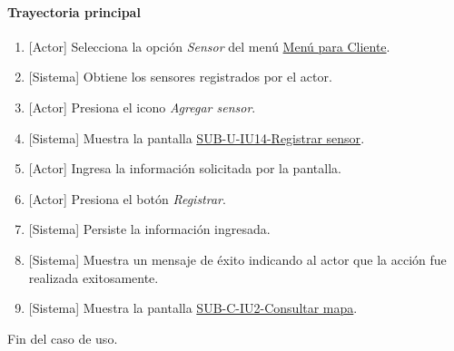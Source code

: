 \paragraph{Trayectoria principal}
	\begin{enumerate}
		\item {[Actor]} Selecciona la opción \textit{Sensor} del menú \hyperref[fig:menu-cliente]{Menú para Cliente}.
		\item {[Sistema]} Obtiene los sensores registrados por el actor.
		\item {[Actor]} Presiona el icono \textit{Agregar sensor}.
		\item {[Sistema]} Muestra la pantalla \hyperref[fig:sub-u-iu14]{SUB-U-IU14-Registrar sensor}.
		\item {[Actor]} Ingresa la información solicitada por la pantalla.
		\item {[Actor]} Presiona el botón \textit{Registrar}.
		\item {[Sistema]} Persiste la información ingresada.
		\item {[Sistema]} Muestra un mensaje de éxito indicando al actor que la acción fue realizada exitosamente.
		\item \label{SUB-U-CU14:Pantalla} {[Sistema]} Muestra la pantalla \hyperref[fig:sub-c-iu2]{SUB-C-IU2-Consultar mapa}.
	\end{enumerate}
	Fin del caso de uso.

